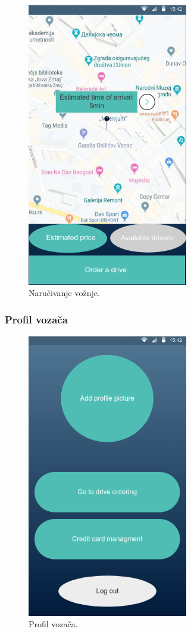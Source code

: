 \begin{figure}[H]
\begin{center}
\includegraphics[width=7cm]{Slike/Narucivanje.png}
\end{center}
    \caption{Naručivanje vožnje.}
\label{fig:Naručivanje vožnje}
\end{figure}

\subsubsection{\bfseries Profil vozača}


\begin{figure}[H]
\begin{center}
\includegraphics[width=7cm]{Slike/Profil.png}
\end{center}
    \caption{Profil vozača.}
\label{fig:Profil vozača}
\end{figure}


